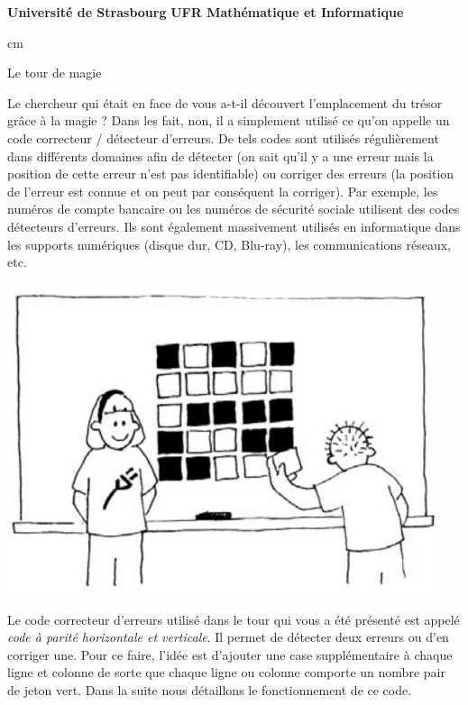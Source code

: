 \documentclass[frenchb,11pt]{article}
\begin{document}
\noindent
{\bf Université de Strasbourg}
\hfill
{\bf UFR Mathématique et Informatique}

 cm

\begin{center}
{\huge Le tour de magie}
\end{center}

\hspace*{-\parindent}%
\begin{minipage}{0.60\linewidth}
Le chercheur qui était en face de vous a-t-il découvert l'emplacement du trésor grâce à la magie ?
Dans les fait, non, il a simplement utilisé ce qu'on appelle un code correcteur / détecteur d'erreurs.
De tels codes sont utilisés régulièrement dans différents domaines afin de détecter (on sait qu'il y a une erreur mais la position de cette erreur n'est pas identifiable) ou corriger des erreurs (la position de l'erreur est connue et on peut par conséquent la corriger).
Par exemple, les numéros de compte bancaire ou les numéros de sécurité sociale utilisent des codes détecteurs d'erreurs.
Ils sont également massivement utilisés en informatique dans les supports numériques (disque dur, CD, Blu-ray), les communications réseaux, etc.
\end{minipage}
\begin{minipage}{0.05\linewidth}
\hfill
\end{minipage}
\begin{minipage}{0.35\linewidth}
\includegraphics[width=0.95\textwidth]{intro.pdf}
\end{minipage}

\vskip 0.1cm
\noindent
Le code correcteur d'erreurs utilisé dans le tour qui vous a été présenté est appelé \textit{code à parité horizontale et verticale}.
Il permet de détecter deux erreurs ou d'en corriger une.
Pour ce faire, l'idée est d'ajouter une case supplémentaire à chaque ligne et colonne de sorte que chaque ligne ou colonne comporte un nombre pair de jeton vert.
Dans la suite nous détaillons le fonctionnement de ce code.
\end{document}
